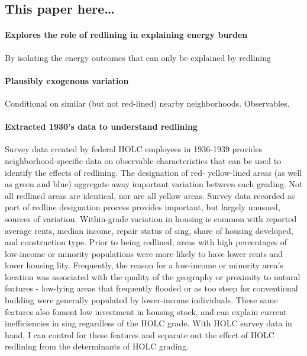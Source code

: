 \documentclass[
]{article}
\begin{document}
\hypertarget{this-paper-here}{%
\subsection{This paper here\ldots{}}\label{this-paper-here}}

\hypertarget{explores-the-role-of-redlining-in-explaining-energy-burden}{%
\paragraph{Explores the role of redlining in explaining energy burden}\label{explores-the-role-of-redlining-in-explaining-energy-burden}}

By isolating the energy outcomes that can only be explained by redlining

\hypertarget{plausibly-exogenous-variation}{%
\paragraph{Plausibly exogenous variation}\label{plausibly-exogenous-variation}}

Conditional on similar (but not red-lined) nearby neighborhoods. Observables.

\hypertarget{extracted-1930s-data-to-understand-redlining}{%
\paragraph{Extracted 1930's data to understand redlining}\label{extracted-1930s-data-to-understand-redlining}}

Survey data created by federal HOLC employees in 1936-1939 provides neighborhood-specific data on observable characteristics that can be used to identify the effects of redlining. The designation of red- yellow-lined areas (as well as green and blue) aggregate away important variation between each grading. Not all redlined areas are identical, nor are all yellow areas. Survey data recorded as part of redline designation process provides important, but largely unusued, sources of variation. Within-grade variation in housing is common with reported average rents, median income, repair status of sing, share of housing developed, and construction type. Prior to being redlined, areas with high percentages of low-income or minority populations were more likely to have lower rents and lower housing lity. Frequently, the reason for a low-income or minority area's location was associated with the quality of the geography or proximity to natural features - low-lying areas that frequently flooded or as too steep for conventional building were generally populated by lower-income individuals. These same features also foment low investment in housing stock, and can explain current inefficiencies in sing regardless of the HOLC grade. With HOLC survey data in hand, I can control for these features and separate out the effect of HOLC redlining from the determinants of HOLC grading.
\end{document}
